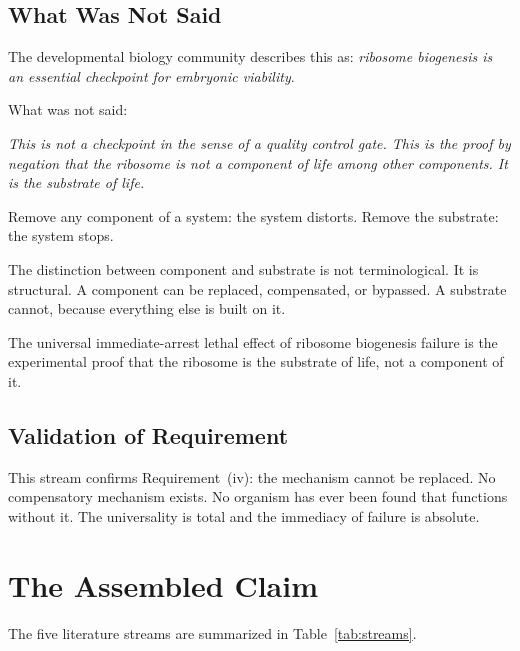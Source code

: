 \documentclass[11pt]{article}
\theoremstyle{definition}
\begin{document}
\subsection{What Was Not Said}

The developmental biology community describes this as:
\emph{ribosome biogenesis is an essential checkpoint for
embryonic viability}.

What was not said:

\emph{This is not a checkpoint in the sense of a quality control
gate.
This is the proof by negation that the ribosome is not a component
of life among other components.
It is the substrate of life.}

Remove any component of a system: the system distorts.
Remove the substrate: the system stops.

The distinction between component and substrate is not
terminological.
It is structural.
A component can be replaced, compensated, or bypassed.
A substrate cannot, because everything else is built on it.

The universal immediate-arrest lethal effect of ribosome
biogenesis failure is the experimental proof that the ribosome
is the substrate of life, not a component of it.

\subsection{Validation of Requirement}

This stream confirms Requirement~(iv): the mechanism cannot be
replaced.
No compensatory mechanism exists.
No organism has ever been found that functions without it.
The universality is total and the immediacy of failure is absolute.

\section{The Assembled Claim}

The five literature streams are summarized in
Table~\ref{tab:streams}.
\end{document}
